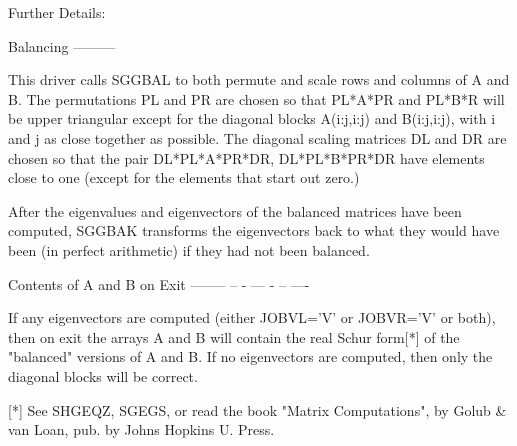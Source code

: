 \begin{DoxyParagraph}{Further Details\+: }
\begin{DoxyVerb}  Balancing
  ---------

  This driver calls SGGBAL to both permute and scale rows and columns
  of A and B.  The permutations PL and PR are chosen so that PL*A*PR
  and PL*B*R will be upper triangular except for the diagonal blocks
  A(i:j,i:j) and B(i:j,i:j), with i and j as close together as
  possible.  The diagonal scaling matrices DL and DR are chosen so
  that the pair  DL*PL*A*PR*DR, DL*PL*B*PR*DR have elements close to
  one (except for the elements that start out zero.)

  After the eigenvalues and eigenvectors of the balanced matrices
  have been computed, SGGBAK transforms the eigenvectors back to what
  they would have been (in perfect arithmetic) if they had not been
  balanced.

  Contents of A and B on Exit
  -------- -- - --- - -- ----

  If any eigenvectors are computed (either JOBVL='V' or JOBVR='V' or
  both), then on exit the arrays A and B will contain the real Schur
  form[*] of the "balanced" versions of A and B.  If no eigenvectors
  are computed, then only the diagonal blocks will be correct.

  [*] See SHGEQZ, SGEGS, or read the book "Matrix Computations",
      by Golub & van Loan, pub. by Johns Hopkins U. Press.\end{DoxyVerb}
 
\end{DoxyParagraph}
\hypertarget{group__realGEeigen_ga6a36f16104f3f8ae8e499cc7efaa2195}{}
